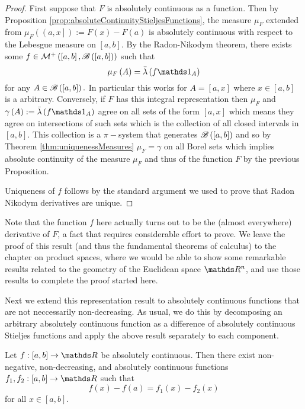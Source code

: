 \begin{proof}
First suppose that $F$ is absolutely continuous as a function. Then
by Proposition \ref{prop:absoluteContinuityStieljesFunctions}, the
measure $\mu_{F}$ extended from $\mu_{F}\left(\left(a,x\right]\right):=F\left(x\right)-F\left(a\right)$
is absolutely continuous with respect to the Lebesgue measure on $\left[a,b\right].$
By the Radon-Nikodym theorem, there exists some $f\in\mathcal{M}^{+}\left(\left[a,b\right],\mathscr{B}\left(\left[a,b\right]\right)\right)$
such that
\[
\mu_{F}\left(A\right)=\lebInt{\lambda}{f\indicate_{A}}
\]
for any $A\in\mathscr{B}\left(\left[a,b\right]\right).$ In particular
this works for $A=\left[a,x\right]$ where $x\in\left[a,b\right]$
is a arbitrary. Conversely, if $F$ has this integral representation
then $\mu_{F}$ and $\gamma\left(A\right):=\lebInt{\lambda}{f\indicate_{A}}$
agree on all sets of the form $\left[a,x\right]$ which means they
agree on intersections of such sets which is the collection of all
closed intervals in $\left[a,b\right].$ This collection is a $\pi-$system
that generates $\mathscr{B}\left(\left[a,b\right]\right)$ and so by Theorem
\ref{thm:uniquenessMeasures} $\mu_{F}=\gamma$ on all Borel sets
which implies absolute continuity of the measure $\mu_{F}$ and thus
of the function $F$ by the previous Proposition.

Uniqueness of $f$ follows by the standard argument we used to prove
that Radon Nikodym derivatives are unique.
\end{proof}
\begin{rem*}
Note that the function $f$ here actually turns out to be the (almost
everywhere) derivative of $F$, a fact that requires considerable
effort to prove. We leave the proof of this result (and thus the fundamental
theorems of calculus) to the chapter on product spaces, where we would
be able to show some remarkable results related to the geometry of
the Euclidean space $\R^{n}$, and use those results to complete the
proof started here.
\end{rem*}
Next we extend this representation result to absolutely continuous
functions that are not neccessarily non-decreasing. As usual, we do
this by decomposing an arbitrary absolutely continuous function as
a difference of absolutely continuous Stieljes functions and apply
the above result separately to each component.
\begin{lem}
\label{lem:decomposeAbsolutelyContinuous}Let $f:\left[a,b\right]\to\R$
be absolutely continuous. Then there exist non-negative, non-decreasing,
and absolutely continuous functions $f_{1},f_{2}:\left[a,b\right]\to\R$
such that 
\[
f\left(x\right)-f\left(a\right)=f_{1}\left(x\right)-f_{2}\left(x\right)
\]
for all $x\in\left[a,b\right]$.
\end{lem}

